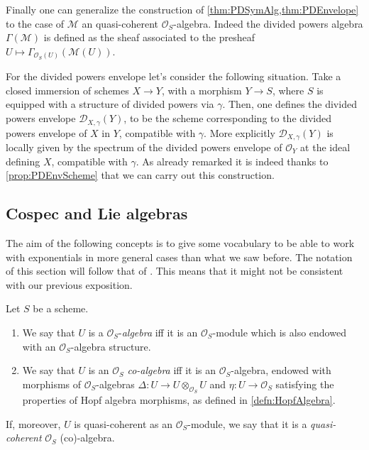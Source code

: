 \begin{rem}[]
	Finally one can generalize the construction
	of \cref{thm:PDSymAlg,thm:PDEnvelope} to the case of $\mathcal{M}$
	an quasi-coherent $\mathcal{O}_{ S }$-algebra.
	Indeed the divided powers algebra $\Gamma(\mathcal{M})$ is defined
	as the sheaf associated to the presheaf 
	$U \mapsto \Gamma_{\mathcal{O}_S(U)}(\mathcal{M}(U))$.

	For the divided powers envelope let's consider the following situation.
	Take a closed immersion of schemes $X \to Y$, with a morphism $Y \to S$,
	where $S$ is equipped with a structure of divided powers via $\gamma$.
	Then, one defines the
	divided powers envelope $\mathcal{D}_{X,\gamma}(Y)$, to be the scheme
	corresponding to the divided powers envelope of $X$ in $Y$,
	compatible with $\gamma$.
	More explicitly $\mathcal{D}_{X,\gamma}(Y)$ is locally 
	given by the spectrum of the divided powers envelope
	of $\mathcal{O}_{ Y }$ at the ideal defining $X$, compatible with $\gamma$.
	As already remarked it is indeed thanks to \cref{prop:PDEnvScheme}
	that we can carry out this construction.
\end{rem}



\subsection{Cospec and Lie algebras}
The aim of the following concepts is to give some vocabulary to
be able to work with exponentials in more general cases than what we saw before.
The notation of this section will follow that of \cite[Capther III]{Messing}.
This means that it might not be consistent with our previous exposition.


\begin{defn}
	Let $S$ be a scheme.
\begin{enumerate}
\item We say that $U$ is a $\mathcal{O}_{ S }$-{\em algebra}
	iff it is an $\mathcal{O}_{ S }$-module
	which is also endowed with an $\mathcal{O}_{ S }$-algebra structure.
\item We say that $U$ is an $\mathcal{O}_{ S }$ {\em co-algebra}
	iff it is an $\mathcal{O}_{ S }$-algebra, endowed with
	morphisms of $\mathcal{O}_S$-algebras
	$\Delta\colon U \to U \otimes_{\mathcal{O}_{ S }} U$
	and $\eta\colon U \to \mathcal{O}_{ S }$
	satisfying the properties of Hopf algebra morphisms,
	as defined in \cref{defn:HopfAlgebra}.
\end{enumerate}
	If, moreover, $U$ is quasi-coherent as an $\mathcal{O}_{ S }$-module,
	we say that it is a {\em quasi-coherent} $\mathcal{O}_{ S }$ (co)-algebra.
\end{defn}


